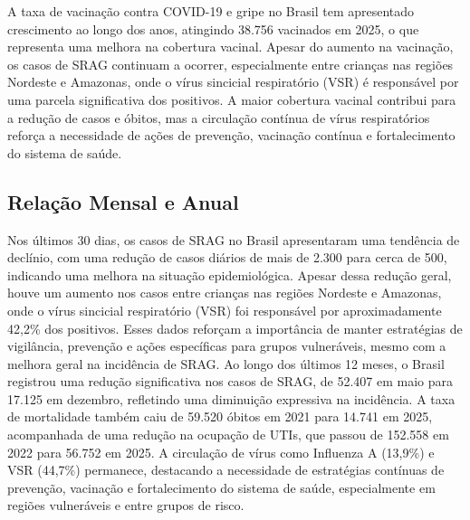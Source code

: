 \documentclass{article}%
\begin{document}
%
A taxa de vacinação contra COVID{-}19 e gripe no Brasil tem apresentado crescimento ao longo dos anos, atingindo 38.756 vacinados em 2025, o que representa uma melhora na cobertura vacinal. Apesar do aumento na vacinação, os casos de SRAG continuam a ocorrer, especialmente entre crianças nas regiões Nordeste e Amazonas, onde o vírus sincicial respiratório (VSR) é responsável por uma parcela significativa dos positivos. A maior cobertura vacinal contribui para a redução de casos e óbitos, mas a circulação contínua de vírus respiratórios reforça a necessidade de ações de prevenção, vacinação contínua e fortalecimento do sistema de saúde.\newline%

%
\subsection{Relação Mensal e Anual}%
\label{subsec:RelaoMensaleAnual}%
Nos últimos 30 dias, os casos de SRAG no Brasil apresentaram uma tendência de declínio, com uma redução de casos diários de mais de 2.300 para cerca de 500, indicando uma melhora na situação epidemiológica. Apesar dessa redução geral, houve um aumento nos casos entre crianças nas regiões Nordeste e Amazonas, onde o vírus sincicial respiratório (VSR) foi responsável por aproximadamente 42,2\% dos positivos. Esses dados reforçam a importância de manter estratégias de vigilância, prevenção e ações específicas para grupos vulneráveis, mesmo com a melhora geral na incidência de SRAG.\newline%
%
Ao longo dos últimos 12 meses, o Brasil registrou uma redução significativa nos casos de SRAG, de 52.407 em maio para 17.125 em dezembro, refletindo uma diminuição expressiva na incidência. A taxa de mortalidade também caiu de 59.520 óbitos em 2021 para 14.741 em 2025, acompanhada de uma redução na ocupação de UTIs, que passou de 152.558 em 2022 para 56.752 em 2025. A circulação de vírus como Influenza A (13,9\%) e VSR (44,7\%) permanece, destacando a necessidade de estratégias contínuas de prevenção, vacinação e fortalecimento do sistema de saúde, especialmente em regiões vulneráveis e entre grupos de risco.\newline%
%
\end{document}
